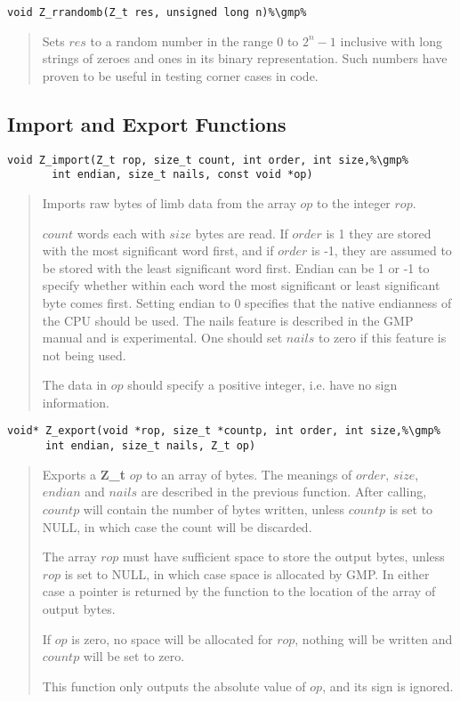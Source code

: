 \documentclass[a4paper,10pt]{article}
\newcommand{\gmp}{\hfill[GMP]}
\begin{document}
\begin{lstlisting}
void Z_rrandomb(Z_t res, unsigned long n)%\gmp%
\end{lstlisting}
\begin{quote}Sets $res$ to a random number in the range 0 to $2^n-1$ inclusive with long strings of zeroes and ones in its binary representation. Such numbers have proven to be useful in testing corner cases in code.\end{quote}

\subsection{Import and Export Functions}
\begin{lstlisting}
void Z_import(Z_t rop, size_t count, int order, int size,%\gmp%
       int endian, size_t nails, const void *op)
\end{lstlisting}
\begin{quote}Imports raw bytes of limb data from the array $op$ to the integer $rop$.

$count$ words each with $size$ bytes are read. If $order$ is 1 they are stored with the most significant word first, and if $order$ is -1, they are assumed to be stored with the least significant word first. Endian can be 1 or -1 to specify whether within each word the most significant or least significant byte comes first. Setting endian to 0 specifies that the native endianness of the CPU should be used. The nails feature is described in the GMP manual and is experimental. One should set $nails$ to zero if this feature is not being used.

The data in $op$ should specify a positive integer, i.e. have no sign information.\end{quote}

\begin{lstlisting}
void* Z_export(void *rop, size_t *countp, int order, int size,%\gmp% 
      int endian, size_t nails, Z_t op)
\end{lstlisting}
\begin{quote}Exports a \textbf{Z\_t} $op$ to an array of bytes. The meanings of $order$, $size$, $endian$ and $nails$ are described in the previous function. After calling, $countp$ will contain the number of bytes written, unless $countp$ is set to NULL, in which case the count will be discarded. 

The array $rop$ must have sufficient space to store the output bytes, unless $rop$ is set to NULL, in which case space is allocated by GMP. In either case a pointer is returned by the function to the location of the array of output bytes.

If $op$ is zero, no space will be allocated for $rop$, nothing will be written and $countp$ will be set to zero.

This function only outputs the absolute value of $op$, and its sign is ignored.\end{quote}
\end{document}
